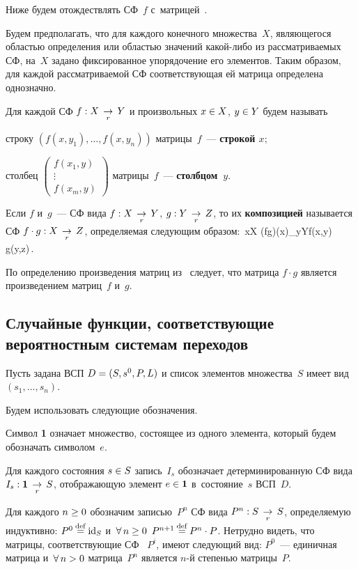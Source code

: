 \begin{multicols}{2}
Ниже  будем отождествлять СФ~$f$ с~матрицей~.

Будем предполагать, что для каждого конечного множества~$X$, являющегося
областью определения или областью значений ка\-кой-либо из
рассматриваемых СФ, на~$X$ задано фиксированное упорядочение
его элементов. Таким образом, для каждой рассматриваемой СФ
соответствующая  ей матрица определена однозначно.

Для каждой СФ $f:X\;\mathop{\to}\limits_{r}\; Y$ и произвольных $x\hm\in X$, $y\hm\in Y$
 будем называть
 \bi
\item строку $(f(x,y_1),\ldots, f(x,y_n))$
   матрицы~$f$~--- {\bf строкой $x$};
\item столбец $\begin{pmatrix}
f(x_1,y)\\
\vdots\\
f(x_m,y)\end{pmatrix}$    матрицы~$f$~--- {\bf столбцом~$y$}.
\ei


Если $f$ и~$g$~--- СФ вида $f: X\;\mathop{\to}\limits_{r}\; Y$, $g: Y\;\mathop{\to}\limits_{r}\; Z$, то
их {\bf композицией} называется СФ $f\cdot g: X\;\mathop{\to}\limits_{r}\; Z$, определяемая следующим
образом:
\forall\,x\in X\quad
(f\cdot g)(x)\eam \sum\limits_{y\in Y}f(x,y)\cdot
g(y,z)\,.
\ee

По определению произведения матриц из~ следует, что
матрица $f\cdot g$ является произведением матриц~$f$ и~$g$.

\vspace*{-6pt}

\subsection{Случайные функции, соответствующие вероятностным системам переходов}
\label{dfgdgdsf44555333}

Пусть задана ВСП $D\hm=(S,s^0, P, L)$ и список элементов множества~$S$
имеет вид $(s_1,\ldots, s_n)$.

Будем использовать  следующие обозначения.
\bn
\item Символ {\bf 1} означает  множество,
состоящее из одного элемента, который будем обозначать символом~$e$.
\item Для каждого состояния $s\hm\in S$ запись~$I_s$
обозначает детерминированную СФ вида
$I_s: {\bf 1} \;\mathop{\to}\limits_{r}\; S$, отображающую элемент $e\hm\in {\bf 1}$ в~состояние~$s$
ВСП~$D$.

\item Для каждого $n\hm\geq 0$
обозначим записью~$P^n$ СФ вида $P^n: S\;\mathop{\to}\limits_{r}\; S$, определяемую индуктивно:
$P^0\mathbin{{\mathop{=}\limits^{\mathrm{def}}}} \mathrm{id}_S$ и~$\forall\,n\geq 0\enskip P^{n+1}\mathbin{{\mathop{=}\limits^{\mathrm{def}}}} P^n\cdot P$.
Нетрудно видеть, что матрицы, соответствующие
СФ~ $P^i$, имеют следующий вид:
$P^0$~--- единичная матрица и~$\forall\,n\hm>0$
матрица~$P^n$  является $n$-й степенью матрицы~$P$.


\end{multicols}
